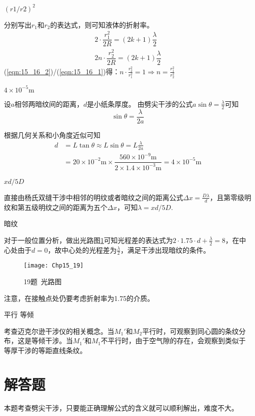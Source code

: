 \exercise $(r1/r2)^2$

\solve 分别写出$r_1$和$r_2$的表达式，则可知液体的折射率。
\begin{gather}
	2\cdot\dfrac{r_1^2}{2R}=(2k+1)\dfrac{\lambda}{2}\label{eqn:15_16_1}\\
	2n\cdot\dfrac{r_2^2}{2R}=(2k+1)\dfrac{\lambda}{2}\label{eqn:15_16_2}
\end{gather}
(\ref{eqn:15_16_2})/(\ref{eqn:15_16_1})得：$n\cdot\frac{r_2^2}{r_1^2}=1\Rightarrow n=\frac{r_1^2}{r_2^2}$


\exercise $4\times10^{-5}\mathrm{m}$

\solve 设$a$相邻两暗纹间的距离，$d$是小纸条厚度。
由劈尖干涉的公式$a\sin\theta=\frac{\lambda}{2}$可知
\[
\sin\theta=\frac{\lambda}{2a}
\]

根据几何关系和小角度近似可知
\begin{align*}
d&=L\tan\theta\approx L\sin\theta=L\frac{\lambda}{2a}\\
&=20\times 10^{-2}\mathrm{m}\times \dfrac{560\times 10^{-9}\mathrm{m}}{2\times 1.4\times 10^{-3}\mathrm{m}}=4\times 10^{-5}\mathrm{m}
\end{align*}

\exercise $xd/5D$

\solve 直接由杨氏双缝干涉中相邻的明纹或者暗纹之间的距离公式$\Delta x=\frac{D\lambda}{d}$，且第零级明纹和第五级明纹之间的距离为五个$\Delta x$，可知$\lambda=xd/5D$.

\exercise 暗纹

\solve 对于一般位置分析，做出光路图\ref{fig:15_19}可知光程差的表达式为$2\cdot 1.75\cdot d+\frac{\lambda}{2}=8$，在中心处由于$d=0$，故中心处的光程差为$\frac{\lambda}{2}$，满足干涉出现暗纹的条件。
\begin{figure}[!h]
	\centering
	\texttt{[image: Chp15\_19]}
	\caption{19题\ 光路图}\label{fig:15_19}
\end{figure}

注意，在接触点处仍要考虑折射率为1.75的介质。

\exercise 平行 等倾

\solve 考查迈克尔逊干涉仪的相关概念。当$M_1'$和$M_2$平行时，可观察到同心圆的条纹分布，这是等倾干涉。当$M_1'$和$M_1$不平行时，由于空气隙的存在，会观察到类似于等厚干涉的等距直线条纹。

\section{解答题}
\exercise 

\analysis
本题考查劈尖干涉，只要能正确理解公式的含义就可以顺利解出，难度不大。

